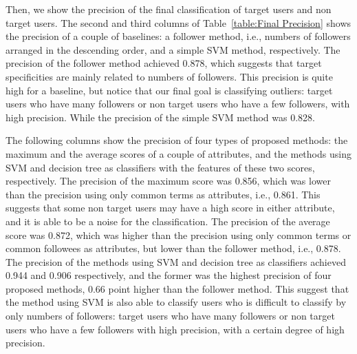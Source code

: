 Then, we show the precision of the final classification of target users
and non target users.  The second and third columns of
Table~\ref{table:Final Precision} shows the precision of a couple of
baselines: a follower method, i.e., numbers of followers arranged in the
descending order, and a simple SVM method, respectively.  The precision
of the follower method achieved 0.878, which suggests that target
specificities are mainly related to numbers of followers.  This
precision is quite high for a baseline, but notice that our final goal
is classifying outliers: target users who have many followers or non
target users who have a few followers, with high precision.  While the
precision of the simple SVM method was 0.828.

The following columns show the precision of four types of proposed
methods: the maximum and the average scores of a couple of attributes,
and the methods using SVM and decision tree as classifiers with the
features of these two scores, respectively.  The precision of the
maximum score was 0.856, which was lower than the precision using only
common terms as attributes, i.e., 0.861.  This suggests that some non
target users may have a high score in either attribute, and it is able
to be a noise for the classification.  The precision of the average
score was 0.872, which was higher than the precision using only common
terms or common followees as attributes, but lower than the follower
method, i.e., 0.878.  The precision of the methods using SVM and
decision tree as classifiers achieved 0.944 and 0.906 respectively,
and the former was the highest precision of four proposed methods, 0.66
point higher than the follower method.  This suggest that the method
using SVM is also able to classify users who is difficult to classify by
only numbers of followers: target users who have many followers or non
target users who have a few followers with high precision, with a
certain degree of high precision.

